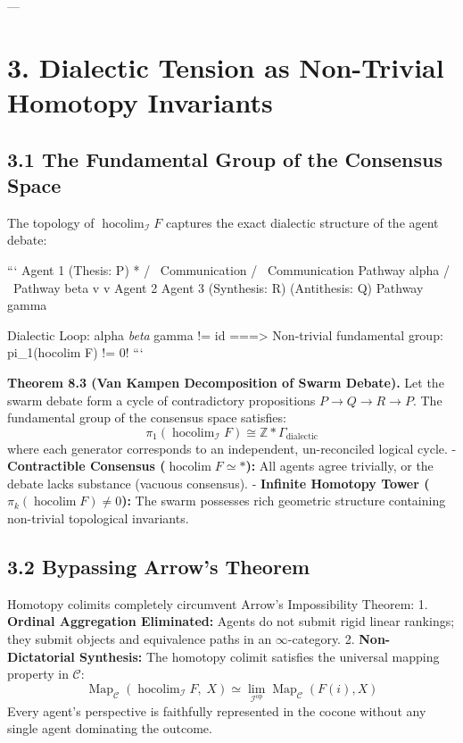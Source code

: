 \documentclass[11pt,twoside,openright]{amsbook}
\begin{document}
{{---

\section{3. Dialectic Tension as Non-Trivial Homotopy Invariants}

\subsection{3.1 The Fundamental Group of the Consensus Space}
The topology of $\operatorname{hocolim}_{\mathcal{I}} F$ captures the exact dialectic structure of the agent debate:

```
               Agent 1 (Thesis: P)
                     *
                    / \
   Communication   /   \   Communication
   Pathway alpha  /     \  Pathway beta
                 v       v
      Agent 2 \textit{  } Agent 3 (Synthesis: R)
        (Antithesis: Q)
              Pathway gamma
              
   Dialectic Loop: alpha \textit{ beta } gamma != id
   ===> Non-trivial fundamental group: pi_1(hocolim F) != 0!
```

\textbf{Theorem 8.3 (Van Kampen Decomposition of Swarm Debate).} Let the swarm debate form a cycle of contradictory propositions $P \to Q \to R \to P$. The fundamental group of the consensus space satisfies:
$$\pi_1(\operatorname{hocolim}_{\mathcal{I}} F) \cong \mathbb{Z} \ast \Gamma_{\mathrm{dialectic}}$$
where each generator corresponds to an independent, un-reconciled logical cycle.
- \textbf{Contractible Consensus ($\operatorname{hocolim} F \simeq *$):} All agents agree trivially, or the debate lacks substance (vacuous consensus).
- \textbf{Infinite Homotopy Tower ($\pi_k(\operatorname{hocolim} F) \neq 0$):} The swarm possesses rich geometric structure containing non-trivial topological invariants.

\subsection{3.2 Bypassing Arrow’s Theorem}
Homotopy colimits completely circumvent Arrow’s Impossibility Theorem:
1. \textbf{Ordinal Aggregation Eliminated:} Agents do not submit rigid linear rankings; they submit objects and equivalence paths in an $\infty$-category.
2. \textbf{Non-Dictatorial Synthesis:} The homotopy colimit satisfies the universal mapping property in $\mathcal{C}$:
   $$\operatorname{Map}_{\mathcal{C}}\left( \operatorname{hocolim}_{\mathcal{I}} F, \; X \right) \simeq \lim_{\mathcal{I}^{\mathrm{op}}} \operatorname{Map}_{\mathcal{C}}(F(i), X)$$
   Every agent’s perspective is faithfully represented in the cocone without any single agent dominating the outcome.

}}
\end{document}
